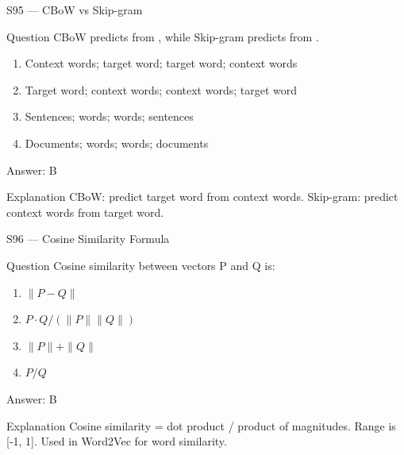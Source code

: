 \documentclass[aspectratio=169,8pt]{beamer}
\begin{document}
	\begin{frame}{S95 --- CBoW vs Skip-gram}
		\begin{block}{Question}
			CBoW predicts   from  , while Skip-gram predicts   from  .
			\begin{enumerate}
				\item Context words; target word; target word; context words
				\item Target word; context words; context words; target word
				\item Sentences; words; words; sentences
				\item Documents; words; words; documents
			\end{enumerate}
		\end{block}
		\begin{exampleblock}{Answer: B}\end{exampleblock}
		\begin{block}{Explanation}
			CBoW: predict target word from context words. Skip-gram: predict context words from target word.
		\end{block}
	\end{frame}
	
	\begin{frame}{S96 --- Cosine Similarity Formula}
		\begin{block}{Question}
			Cosine similarity between vectors P and Q is:
			\begin{enumerate}
				\item $\|P - Q\|$
				\item $P \cdot Q / (\|P\| \|Q\|)$
				\item $\|P\| + \|Q\|$
				\item $P/Q$
			\end{enumerate}
		\end{block}
		\begin{exampleblock}{Answer: B}\end{exampleblock}
		\begin{block}{Explanation}
			Cosine similarity = dot product / product of magnitudes. Range is [-1, 1]. Used in Word2Vec for word similarity.
		\end{block}
	\end{frame}
	
\end{document}
